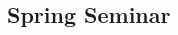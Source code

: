 \documentclass{article}
\newcounter{cntSemester} %
\begin{document}
\begin{multicols}{2}
\begin{comment}
	P a g e |2EASTERN CLASSICS
	SEMINAR
	FALL – SEMINAR
	(Continued)
	Session 16
	Session 24
	Han Feizi : Basic Writings, Translated by Burton
	Watson. Sections 5-10.
	“Kena Upaniṣ ad” and “Mundaka Upanisad”
	Session 25
	Session 17
	“The Nyāya Sūtra,” in A Sourcebook in Indian
	Philosophy, edited by Sarvepalli
	Radhakrishnan and Charles A. Moore pp. 358
	– 379.24.
	Han Feizi : Basic Writings, Translated by Burton
	Watson. Sections 12, 13, 17, 18, 49, 50.
	Session 18
	The Rig Veda : An Anthology Translated by
	Wendy Doniger. Sections 10.129, 10.121,
	10.90, 10.130, 10.190, 10.81-82, 10.72, 10.14,
	10.16, 10.18, 10.154, 10.135, 10.58, 10.71,
	10.125, 10.101, 10.151, 1.164, 1.163, 1.162,
	10.56Session 26
	Session 19Tattva-Kaumudî, karikas 1 – 29. Including
	commentary by Vacaspati Misra. Available in
	EC Manual.
	The Rig Veda : An Anthology. Sections 1.1, 1.26,
	5.2, 2.35, 10.51, 10.124, 10.5, 8.79, 9.74, 4.58,
	8.48, 10.136, 4.18, 10.28, 1.32, 2.12, 5.83,
	7.101, 1.50, 1.160, 1.185, 6.70; 10.10, 1.179,
	“The Vaiśeṣika Sūtra” and “The
	Padārthadharmasaṁgraha,” in A Sourcebook in
	Indian Philosophy, pp. 387– 423.
	Session 27
	Session 28
	Tattva-Kaumudî, karikas 30 - End.
	10.95, 10.85.
	Session 20
	Session 29
	Bṛhadāraṇyaka Upaniṣad,” Parts I \& II“The Yoga Philosophy of Patañjali” in A
	Sourcebook in Indian Philosophy, pp. 454 - 485
	Session 21Session 30
	Bṛhadāraṇyaka Upaniṣad,” Parts III \& IV
	Session 22
	The Bhagavadgītā in the Mahābhārata translated
	by J.A.B. van Buitenen. Pp. 39-107
	Bṛhadāraṇyaka Upaniṣad,” Parts V \& VISession 31
	Session 23 [ESSAYS DUE]The Bhagavadgītā in the Mahābhārata translated
	by J.A.B. van Buitenen. Pp. 107 - 157
	“Katha Upanisad”

	\end{comment}

\end{multicols}



\clearpage



\begin{center}
	\section{Spring Seminar}
\end{center}
\end{document}
